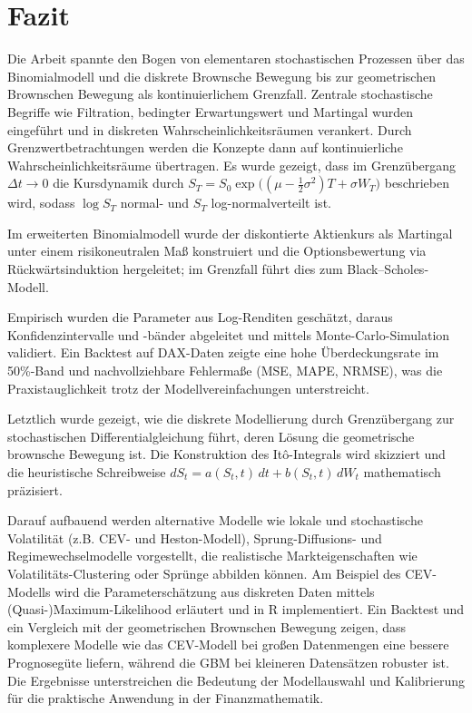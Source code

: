 \section{Fazit}

Die Arbeit spannte den Bogen von elementaren stochastischen Prozessen über das Binomialmodell und die diskrete Brownsche 
Bewegung bis zur geometrischen Brownschen Bewegung als kontinuierlichem Grenzfall. Zentrale stochastische Begriffe wie 
Filtration, bedingter Erwartungswert und Martingal wurden eingeführt und in diskreten Wahrscheinlichkeitsräumen verankert. 
Durch Grenzwertbetrachtungen werden die Konzepte dann auf kontinuierliche Wahrscheinlichkeitsräume übertragen. Es wurde gezeigt, dass im Grenzübergang $\Delta t \to 0$ die Kursdynamik durch
$S_T = S_0 \exp\!\big((\mu - \tfrac12\sigma^2)T + \sigma W_T\big)$
beschrieben wird, sodass $\log S_T$ normal- und $S_T$ log-normalverteilt ist. 

Im erweiterten Binomialmodell wurde der diskontierte Aktienkurs als Martingal unter einem risikoneutralen Maß konstruiert und die Optionsbewertung 
via Rückwärtsinduktion hergeleitet; im Grenzfall führt dies zum Black–Scholes-Modell.

Empirisch wurden die Parameter aus 
Log-Renditen geschätzt, daraus Konfidenzintervalle und -bänder abgeleitet und mittels Monte-Carlo-Simulation validiert. 
Ein Backtest auf DAX-Daten zeigte eine hohe Überdeckungsrate im 50\%-Band und nachvollziehbare Fehlermaße (MSE, MAPE, NRMSE), 
was die Praxistauglichkeit trotz der Modellvereinfachungen unterstreicht. 

Letztlich wurde gezeigt, wie die diskrete Modellierung durch Grenzübergang zur stochastischen Differentialgleichung führt, deren Lösung die 
geometrische brownsche Bewegung ist. Die Konstruktion des Itô-Integrals wird skizziert und die 
heuristische Schreibweise $dS_t = a(S_t,t)\,dt + b(S_t,t)\,dW_t$ mathematisch präzisiert.

Darauf aufbauend werden alternative Modelle wie lokale und stochastische Volatilität (z.B. CEV- und Heston-Modell), Sprung-Diffusions- und Regimewechselmodelle vorgestellt, die realistische Markteigenschaften wie Volatilitäts-Clustering oder Sprünge abbilden können. 
Am Beispiel des CEV-Modells wird die Parameterschätzung aus diskreten Daten mittels (Quasi-)Maximum-Likelihood erläutert und in R implementiert. Ein Backtest und ein Vergleich mit der geometrischen Brownschen Bewegung zeigen, dass komplexere Modelle wie das CEV-Modell bei großen Datenmengen eine bessere Prognosegüte liefern, während die GBM bei kleineren Datensätzen robuster ist. Die Ergebnisse unterstreichen die Bedeutung der Modellauswahl und Kalibrierung für die praktische Anwendung in der Finanzmathematik.


